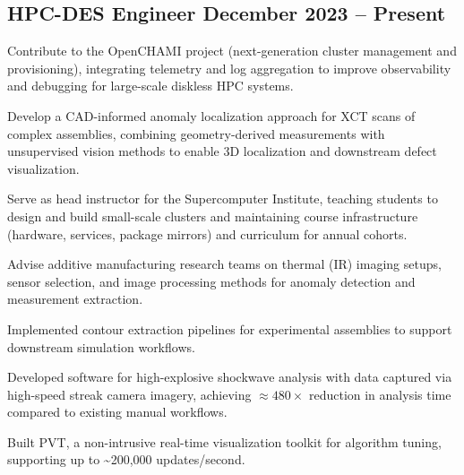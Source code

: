 
\subsection{{HPC-DES Engineer \hfill December 2023 -- Present}}
\begin{zitemize}
    \item Contribute to the OpenCHAMI project (next-generation cluster
          management and provisioning), integrating telemetry and log
          aggregation to improve observability and debugging for large-scale
          diskless HPC systems.
    \item Develop a CAD-informed anomaly localization approach for XCT scans of
          complex assemblies, combining geometry-derived measurements with
          unsupervised vision methods to enable 3D localization and downstream
          defect visualization.
    \item Serve as head instructor for the Supercomputer Institute, teaching
          students to design and build small-scale clusters and maintaining
          course infrastructure (hardware, services, package mirrors) and
          curriculum for annual cohorts.
    \item Advise additive manufacturing research teams on thermal (IR) imaging
          setups, sensor selection, and image processing methods for anomaly
          detection and measurement extraction.
    \item Implemented contour extraction pipelines for experimental assemblies
          to support downstream simulation workflows.
    \item Developed software for high-explosive shockwave analysis with data
          captured via high-speed streak camera imagery, achieving
          $\approx480\times$ reduction in analysis time compared to existing
          manual workflows.
    \item Built PVT, a non-intrusive real-time visualization toolkit for
          algorithm tuning, supporting up to \textasciitilde200{,}000
          updates/second.
\end{zitemize}

